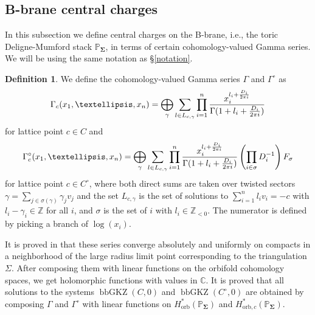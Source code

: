 \documentclass[11pt,reqno]{amsart}
\def\CC {{\mathbb C}}
\def\Z {{\mathbb Z}}
\def\PP {{\mathbb P}}
\def\ii {{\rm i}}
\theoremstyle{definition}
\newtheorem{definition}[theorem]{Definition}
\numberwithin{equation}{section}
\begin{document}
\subsection{B-brane central charges}

In this subsection we define central charges on the B-brane, i.e., the toric Deligne-Mumford stack $\PP_{\mathbf{\Sigma}}$, in terms of certain cohomology-valued Gamma series. We will be using the same notation as \S\ref{notation}. 

\smallskip



\begin{definition}\label{definition of gamma series}
We define the cohomology-valued Gamma series $\Gamma$ and $\Gamma^{\circ}$ as
\begin{align}
\Gamma_c(x_1,\ldots,x_n) =\bigoplus_{\gamma} \sum_{l\in L_{c,\gamma}} \prod_{i=1}^n 
\frac {x_i^{l_i+\frac {D_i}{2\pi \ii }}}{\Gamma(1+l_i+\frac {D_i}{2\pi \ii })}
\end{align}
for lattice point $c\in C$ and
\begin{align*}
\Gamma_c^{\circ}(x_1,\ldots,x_n) =\bigoplus_{\gamma} \sum_{l\in L_{c,\gamma}} \prod_{i=1}^n 
\frac {x_i^{l_i+\frac {D_i}{2\pi \ii }}}{\Gamma(1+l_i+\frac {D_i}{2\pi \ii })}\left(\prod_{i\in\sigma}D_i^{-1}\right)F_{\sigma}
\end{align*}
for lattice point $c\in C^{\circ}$, where both direct sums are taken over twisted sectors $\gamma = \sum_{j\in \sigma(\gamma)} \gamma_j v_j$ and the set $L_{c,\gamma}$ is the set of solutions to $\sum_{i=1}^n l_i v_i = -c$ with $l_i-\gamma_i \in \Z$ for all $i$, and $\sigma$ is the set of $i$ with $l_i\in\Z_{<0}$. The numerator is defined by picking a branch of $\log(x_i)$.
\end{definition}

\smallskip

It is proved in \cite{BHanDuality} that these series converge absolutely and uniformly on compacts in a neighborhood of the large radius limit point corresponding to the triangulation $\Sigma$. After composing them with linear functions on the orbifold cohomology spaces, we get holomorphic functions with values in $\CC$. It is proved that all solutions to the systems $\operatorname{bbGKZ}(C,0)$ and $\operatorname{bbGKZ}(C^{\circ},0)$ are obtained by composing $\Gamma$ and $\Gamma^{\circ}$ with linear functions on $H_{\mathrm{orb}}^*(\PP_{\mathbf{\Sigma}})$ and $H_{\mathrm{orb},c}^*(\PP_{\mathbf{\Sigma}})$.

\smallskip
\end{document}
